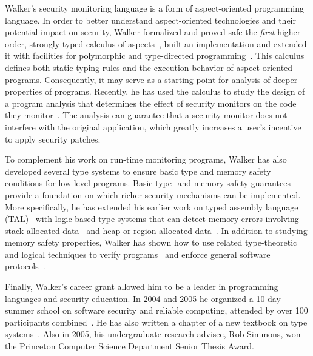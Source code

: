 \documentclass[11pt]{article}
\begin{document}
Walker's security monitoring language is a form of aspect-oriented programming language.
In order to better understand aspect-oriented technologies and their
potential impact on security, Walker formalized and proved
safe the {\em first} higher-order, strongly-typed calculus of 
aspects~\cite{walker+:aspects}, built an implementation and extended it with facilities for polymorphic
and type-directed programming~\cite{dantas+:polyaml}.  This calculus defines
both static typing rules and the execution behavior of aspect-oriented
programs.  Consequently, it may
serve as a starting point for analysis of deeper properties of programs.
Recently, he has used the calculus to study the design of a
program analysis that determines the effect of security monitors on
the code they monitor~\cite{dantas+:harmless-advice,dantas+:harmless-popl}.   The analysis
can guarantee that a security monitor does not interfere with the 
original application, which greatly increases a user's incentive
to apply security patches.

To complement his work on run-time monitoring programs, Walker has also
developed several type systems to ensure basic type and memory safety conditions
for low-level programs.  Basic type- and memory-safety guarantees provide a foundation on which
richer security mechanisms can be implemented.  More specifically, he
has extended his earlier work on typed assembly language (TAL)~\cite{morrisett+:tal,morrisett+:journal-stal} with
logic-based type systems that can detect memory errors involving
stack-allocated data~\cite{ahmed+:stack,jia+:stack} and heap or region-allocated
data~\cite{ahmed+:hierarchical-storage}.  In addition to studying memory safety
properties, Walker has shown how to use related type-theoretic and logical techniques
to verify programs~\cite{jia+:ilc} and enforce general software
protocols~\cite{mandelbaum+:refinements}.  

Finally, Walker's career grant allowed him to be a leader in
programming languages and security education. In 2004 and 2005 he organized
a 10-day summer school on software security and reliable computing,
attended by over 100 participants combined~\cite{summerschool04,summerschool05}.  He has also written a
chapter of a new textbook on type systems~\cite{walker:attapl}.  Also in 2005, his
undergraduate research advisee, Rob Simmons, won the Princeton Computer Science Department
Senior Thesis Award.



\newpage
\end{document}
